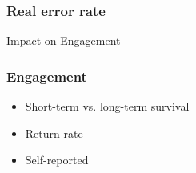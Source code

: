 \documentclass[bigger]{beamer}
\begin{document}
\begin{frame}
  \frametitle{Real error rate}
\end{frame}


\begin{frame}
	\begin{center}
    {\Huge Impact on Engagement} 
	\end{center}
\end{frame}

\begin{frame}
  \frametitle{Engagement}
	\begin{itemize}
		\item Short-term vs. long-term survival
		\item Return rate
		\item Self-reported
	\end{itemize}

\end{frame}
\end{document}
